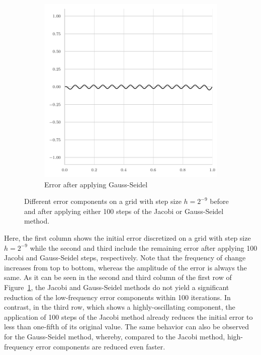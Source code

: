 \begin{figure}
\begin{subfigure}[t]{0.32\textwidth}
		\includegraphics[width=\textwidth]{figures/error_plots//final_error_gauss_seidel_32pi.pdf}
	\caption{Error after applying Gauss-Seidel}
	\end{subfigure}
	\caption{Different error components on a grid with step size $h = 2^{-9}$ before and after applying either 100 steps of the Jacobi or Gauss-Seidel method.}
	\label{fig:different-error-components}
\end{figure}
Here, the first column shows the initial error discretized on a grid with step size $h = 2^{-9}$ while the second and third include the remaining error after applying 100 Jacobi and Gauss-Seidel steps, respectively.
Note that the frequency of change increases from top to bottom, whereas the amplitude of the error is always the same.
As it can be seen in the second and third column of the first row of Figure~\ref{fig:different-error-components}, the Jacobi and Gauss-Seidel methods do not yield a significant reduction of the low-frequency error components within 100 iterations.
In contrast, in the third row, which shows a highly-oscillating component, the application of 100 steps of the Jacobi method already reduces the initial error to less than one-fifth of its original value.
The same behavior can also be observed for the Gauss-Seidel method, whereby, compared to the Jacobi method, high-frequency error components are reduced even faster.
